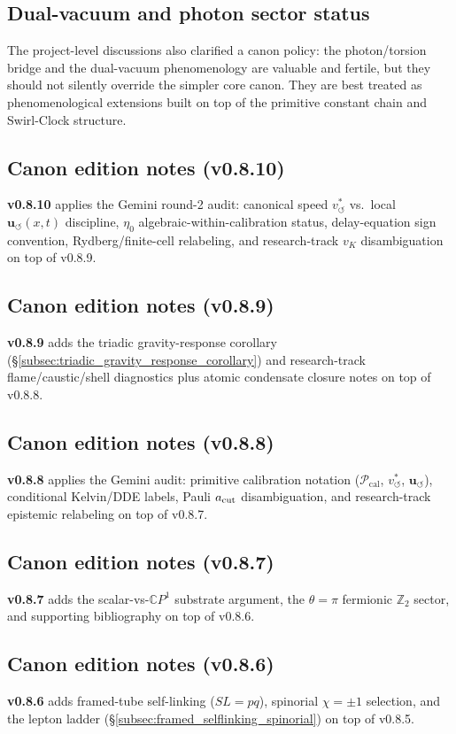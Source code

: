 \documentclass[11pt]{article}
\theoremstyle{definition}
\theoremstyle{plain}
\theoremstyle{remark}
\newcommand{\vchar}{v_{\!\boldsymbol{\circlearrowleft}}^{\ast}}
\newcommand{\uswirl}{\mathbf{u}_{\!\boldsymbol{\circlearrowleft}}}
\begin{document}
        \subsection{Dual-vacuum and photon sector status}
            The project-level discussions also clarified a canon policy: the photon/torsion bridge and the dual-vacuum phenomenology are valuable and fertile, but they should not silently override the simpler core canon. They are best treated as phenomenological extensions built on top of the primitive constant chain and Swirl-Clock structure.

        \subsection{Canon edition notes (v0.8.10)}
            \textbf{v0.8.10} applies the Gemini round-2 audit: canonical speed $\vchar$ vs.\ local $\uswirl(x,t)$ discipline, $\eta_0$ algebraic-within-calibration status, delay-equation sign convention, Rydberg/finite-cell relabeling, and research-track $v_K$ disambiguation on top of v0.8.9.

        \subsection{Canon edition notes (v0.8.9)}
            \textbf{v0.8.9} adds the triadic gravity-response corollary (\S\ref{subsec:triadic_gravity_response_corollary}) and research-track flame/caustic/shell diagnostics plus atomic condensate closure notes on top of v0.8.8.

        \subsection{Canon edition notes (v0.8.8)}
            \textbf{v0.8.8} applies the Gemini audit: primitive calibration notation ($\mathcal{P}_{\mathrm{cal}}$, $\vchar$, $\uswirl$), conditional Kelvin/DDE labels, Pauli $a_{\rm cut}$ disambiguation, and research-track epistemic relabeling on top of v0.8.7.

        \subsection{Canon edition notes (v0.8.7)}
            \textbf{v0.8.7} adds the scalar-vs-$\mathbb{C}P^1$ substrate argument, the $\theta=\pi$ fermionic $\mathbb{Z}_2$ sector, and supporting bibliography on top of v0.8.6.

        \subsection{Canon edition notes (v0.8.6)}
            \textbf{v0.8.6} adds framed-tube self-linking ($SL=pq$), spinorial $\chi=\pm1$ selection, and the lepton ladder (\S\ref{subsec:framed_selflinking_spinorial}) on top of v0.8.5.
\end{document}
